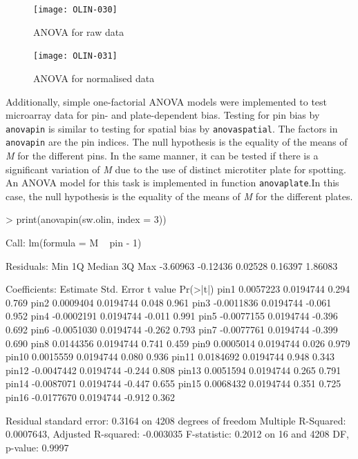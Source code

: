 \documentclass[a4paper,11pt]{article}
\begin{document}
\begin{figure}[t]
\centering
\texttt{[image: OLIN-030]}
\caption{ANOVA for raw data}
\label{anova}
\end{figure}

\begin{figure}[t]
\centering
\texttt{[image: OLIN-031]}
\caption{ANOVA for normalised data}
\label{anovaolin}
\end{figure}


Additionally, simple one-factorial ANOVA 
models were implemented to test microarray data for  pin- and plate-dependent
bias. Testing for pin bias by \texttt{anovapin} is similar to testing for spatial 
bias by \texttt{anovaspatial}. The factors in \texttt{anovapin} are the pin indices.
The null hypothesis is the equality of the means of \emph{M} for the different pins.
In the same manner, it can be tested if there is a significant variation of \emph{M}
due to the use of distinct microtiter plate for spotting. An ANOVA model for this
task is implemented in function \texttt{anovaplate}.In this case, the null hypothesis 
is the equality of the means of \emph{M} for the different plates.

\begin{Schunk}
\begin{Sinput}
> print(anovapin(sw.olin, index = 3))
\end{Sinput}
\begin{Soutput}
Call:
lm(formula = M ~ pin - 1)

Residuals:
     Min       1Q   Median       3Q      Max 
-3.60963 -0.12436  0.02528  0.16397  1.86083 

Coefficients:
        Estimate Std. Error t value Pr(>|t|)
pin1   0.0057223  0.0194744   0.294    0.769
pin2   0.0009404  0.0194744   0.048    0.961
pin3  -0.0011836  0.0194744  -0.061    0.952
pin4  -0.0002191  0.0194744  -0.011    0.991
pin5  -0.0077155  0.0194744  -0.396    0.692
pin6  -0.0051030  0.0194744  -0.262    0.793
pin7  -0.0077761  0.0194744  -0.399    0.690
pin8   0.0144356  0.0194744   0.741    0.459
pin9   0.0005014  0.0194744   0.026    0.979
pin10  0.0015559  0.0194744   0.080    0.936
pin11  0.0184692  0.0194744   0.948    0.343
pin12 -0.0047442  0.0194744  -0.244    0.808
pin13  0.0051594  0.0194744   0.265    0.791
pin14 -0.0087071  0.0194744  -0.447    0.655
pin15  0.0068432  0.0194744   0.351    0.725
pin16 -0.0177670  0.0194744  -0.912    0.362

Residual standard error: 0.3164 on 4208 degrees of freedom
Multiple R-Squared: 0.0007643,	Adjusted R-squared: -0.003035 
F-statistic: 0.2012 on 16 and 4208 DF,  p-value: 0.9997 
\end{Soutput}
\end{Schunk}
\end{document}
